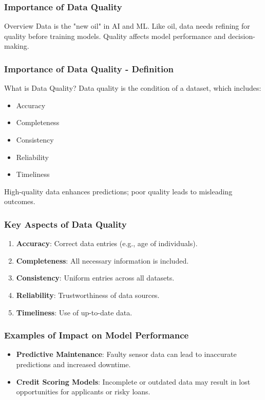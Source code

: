 \documentclass[aspectratio=169]{beamer}
\begin{document}
\begin{frame}[fragile]
    \frametitle{Importance of Data Quality}
    \begin{block}{Overview}
        Data is the "new oil" in AI and ML. Like oil, data needs refining for quality before training models. Quality affects model performance and decision-making.
    \end{block}
\end{frame}

\begin{frame}[fragile]
    \frametitle{Importance of Data Quality - Definition}
    \begin{block}{What is Data Quality?}
        Data quality is the condition of a dataset, which includes:
        \begin{itemize}
            \item Accuracy
            \item Completeness
            \item Consistency
            \item Reliability
            \item Timeliness
        \end{itemize}
        High-quality data enhances predictions; poor quality leads to misleading outcomes.
    \end{block}
\end{frame}

\begin{frame}[fragile]
    \frametitle{Key Aspects of Data Quality}
    \begin{enumerate}
        \item \textbf{Accuracy}: Correct data entries (e.g., age of individuals).
        \item \textbf{Completeness}: All necessary information is included.
        \item \textbf{Consistency}: Uniform entries across all datasets.
        \item \textbf{Reliability}: Trustworthiness of data sources.
        \item \textbf{Timeliness}: Use of up-to-date data.
    \end{enumerate}
\end{frame}

\begin{frame}[fragile]
    \frametitle{Examples of Impact on Model Performance}
    \begin{itemize}
        \item \textbf{Predictive Maintenance}: Faulty sensor data can lead to inaccurate predictions and increased downtime.
        \item \textbf{Credit Scoring Models}: Incomplete or outdated data may result in lost opportunities for applicants or risky loans.
    \end{itemize}
\end{frame}
\end{document}
